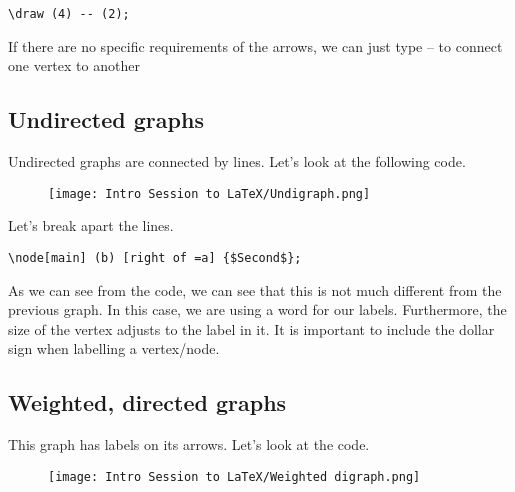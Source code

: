 \documentclass[11pt]{article}
\begin{document}
\verb|\draw (4) -- (2);|

\vspace{3mm}
If there are no specific requirements of the arrows, we can just type -- to connect one vertex to another

\pagebreak{}

\subsection{Undirected graphs}
Undirected graphs are connected by lines. Let's look at the following code.

\vspace{3mm}
\begin{figure}[htbp]
    \centerline{\texttt{[image: Intro Session to LaTeX/Undigraph.png]}}
\end{figure}
\vspace{3mm}

\begin{center}
\end{center}

Let's break apart the lines.

\vspace{3mm}
\verb|\node[main] (b) [right of =a] {$Second$};|
\vspace{3mm}

As we can see from the code, we can see that this is not much different from the previous graph. In this case, we are using a word for our labels. Furthermore, the size of the vertex adjusts to the label in it. It is important to include the dollar sign when labelling a vertex/node.

\pagebreak{}

\subsection{Weighted, directed graphs}
This graph has labels on its arrows. Let's look at the code.
\vspace{3mm}

\vspace{3mm}
\begin{figure}[htbp]
    \centerline{\texttt{[image: Intro Session to LaTeX/Weighted digraph.png]}}
\end{figure}
\vspace{3mm}
\end{document}
